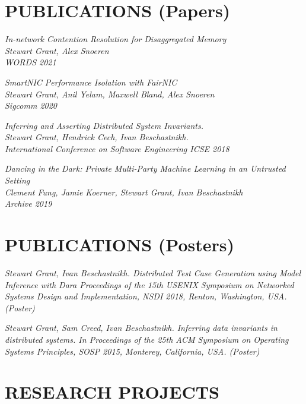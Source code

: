 \documentclass[line,margin]{res}
\begin{document}
\address{https://www.stewartgrant.ca}
\address{ssgrant@eng.ucsd.edu}
\begin{resume}

    \section{PUBLICATIONS (Papers)}

{\sl 
    In-network Contention Resolution for Disaggregated Memory \\
    Stewart Grant, Alex Snoeren\\
    WORDS 2021 \\
    }

{\sl 
    SmartNIC Performance Isolation with FairNIC \\
    Stewart Grant, Anil Yelam, Maxwell Bland, Alex Snoeren\\
    Sigcomm 2020 \\
    }

{\sl 
    Inferring and Asserting Distributed System Invariants. \\
    Stewart Grant, Hendrick Cech, Ivan Beschastnikh. \\
    International Conference on Software Engineering ICSE 2018 \\
    }

{\sl 
    Dancing in the Dark: Private Multi-Party Machine Learning in an Untrusted Setting \\
    Clement Fung, Jamie Koerner, Stewart Grant, Ivan Beschastnikh \\
    Archive 2019
    }

\section{PUBLICATIONS (Posters)}

{\sl Stewart Grant, Ivan Beschastnikh. 
    Distributed Test Case Generation using Model Inference with Dara
    \it{Proceedings of the 15th
    USENIX Symposium on Networked Systems Design and Implementation, NSDI 2018},
    Renton, Washington, USA. (Poster)}

{\sl Stewart Grant, Sam Creed, Ivan Beschastnikh. Inferring data
    invariants in distributed systems. In \it{Proceedings of the 25th
    ACM Symposium on Operating Systems Principles, SOSP 2015},
    Monterey, California, USA. (Poster)}


\section{RESEARCH PROJECTS}


\end{resume}
\end{document}
